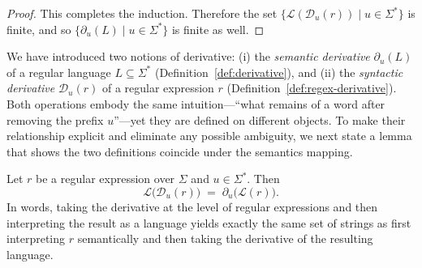 \begin{proof}
\smallskip
This completes the induction. Therefore the set \(\{\mathcal{L}(\mathcal{D}_u(r)) \mid u\in\Sigma^*\}\) is finite, and so \(\{\partial_u(L)\mid u\in\Sigma^*\}\) is finite as well.
\end{proof}
\noindent
We have introduced two notions of derivative: 
(i) the \emph{semantic derivative}\/ $\partial_{u}(L)$ of a regular language $L\!\subseteq\!\Sigma^{*}$ (Definition~\ref{def:derivative}), and 
(ii) the \emph{syntactic derivative}\/ $\mathcal{D}_{u}(r)$ of a regular expression $r$ (Definition~\ref{def:regex-derivative}). 
Both operations embody the same intuition—``what remains of a word after removing the prefix $u$''—yet they are defined on different objects.  
To make their relationship explicit and eliminate any possible ambiguity, we next state a lemma that shows the two definitions coincide under the semantics mapping.

\begin{theorem}\label{the:two-derivative-mapping}
  Let \(r\) be a regular expression over \(\Sigma\) and \(u\in\Sigma^{*}\).
  Then
  \[
      \mathcal{L}\bigl(\mathcal{D}_{u}(r)\bigr)
      \;=\;
      \partial_{u}\bigl(\mathcal{L}(r)\bigr).
  \]
  In words, taking the derivative at the level of regular expressions and
  then interpreting the result as a language yields exactly the same set of
  strings as first interpreting \(r\) semantically and then taking the
  derivative of the resulting language.
\end{theorem}


